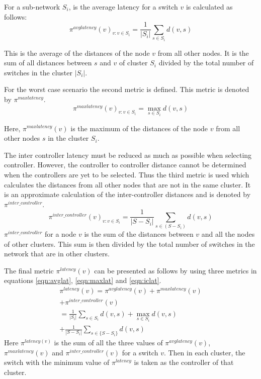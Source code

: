 \documentclass[a4paper,twocolumn,preprint]{elsarticle}
\begin{document}
For a sub-network $S_i$, is the average latency for a switch $v$ is calculated as follows:
\begin{equation}	\label{eqn:avglat}
\pi^{avglatency}(v)_{v:v\in S_i} = \frac{1}{|S_i|} \sum_{s\in S_i}d(v,s)
\end{equation}

This is the average of the distances of the node $v$ from all other nodes. It is the sum of all distances between $s$ and $v$ of cluster $S_i$ divided by the total number of switches in the cluster $|S_i|$.

For the worst case scenario the second metric is defined. This metric is denoted by $\pi^{maxlatency}$.
\begin{equation}	\label{eqn:maxlat}
\pi^{maxlatency}(v)_{v:v\in S_i} = \max_{s\in S_i}d(v,s)
\end{equation}

Here, $\pi^{maxlatency}(v)$ is the maximum of the distances of the node $v$ from all other nodes $s$ in the cluster $S_i$.

The inter controller latency must be reduced as much as possible when selecting controller. However, the controller to controller distance cannot be determined when the controllers are yet to be selected. Thus the third metric is used which calculates the distances from all other nodes that are not in the same cluster. It is an approximate calculation of the inter-controller distances and is denoted by $\pi^{inter\_controller}$.
\begin{equation}	\label{eqn:iclat}
\pi^{inter\_controller}(v)_{v:v\in S_i} = \frac{1}{|S-S_i|} \sum_{s\in (S-S_i)}d(v,s)
\end{equation}
$\pi^{inter\_controller}$ for a node $v$ is the sum of the distances between $v$ and all the nodes of other clusters. This sum is then divided by the total number of switches in the network that are in other clusters.

The final metric $\pi^{latency}(v)$ can be presented as follows by using three metrics in equations \ref{eqn:avglat}, \ref{eqn:maxlat} and \ref{eqn:iclat}.
\begin{equation}	\label{eqn:totlat}
\begin{split}
\pi^{latency}(v) = \pi^{avglatency}(v) + \pi^{maxlatency}(v) \\
 + \pi^{inter\_controller}(v)\\
 =\frac{1}{|S_i|} \sum_{s\in S_i}d(v,s) + \max_{s\in S_i}d(v,s) \\
 + \frac{1}{|S-S_i|} \sum_{s\in \{S-S_i\}}d(v,s)
\end{split}
\end{equation}
Here $\pi^{latency(v)}$ is the sum of all the three values of $\pi^{avglatency}(v)$, $\pi^{maxlatency}(v)$ and $\pi^{inter\_controller}(v)$ for a switch $v$. Then in each cluster, the switch with the minimum value of $\pi^{latency}$ is taken as the controller of that cluster.
\end{document}
